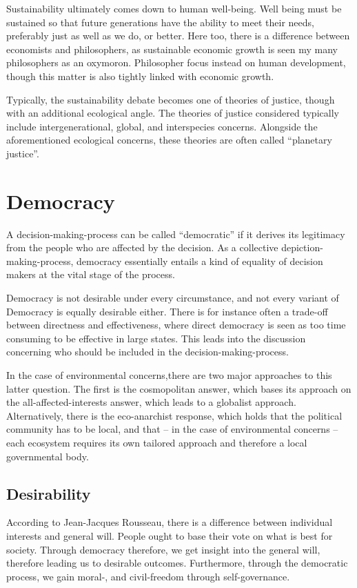 \documentclass[12pt]{report}
\begin{document}
Sustainability ultimately comes down to human well-being. Well being must be
sustained so that future generations have the ability to meet their needs,
preferably just as well as we do, or better. Here too, there is a difference
between economists and philosophers, as sustainable economic growth is seen my
many philosophers as an oxymoron. Philosopher focus instead on human
development, though this matter is also tightly linked with economic growth.

Typically, the sustainability debate becomes one of theories of justice, though
with an additional ecological angle. The theories of justice considered
typically include intergenerational, global, and interspecies concerns.
Alongside the aforementioned ecological concerns, these theories are often
called ``planetary justice''.

\chapter{Democracy}

A decision-making-process can be called ``democratic'' if it derives its
legitimacy from the people who are affected by the decision. As a collective
depiction-making-process, democracy essentially entails a kind of equality of
decision makers at the vital stage of the process.

Democracy is not desirable under every circumstance, and not every variant of
Democracy is equally desirable either. There is for instance often a trade-off
between directness and effectiveness, where direct democracy is seen as too time
consuming to be effective in large states. This leads into the discussion
concerning who should be included in the decision-making-process.

In the case of environmental concerns,there are two major approaches to this
latter question. The first is the cosmopolitan answer, which bases its approach
on the all-affected-interests answer, which leads to a globalist approach.
Alternatively, there is the eco-anarchist response, which holds that the
political community has to be local, and that -- in the case of environmental
concerns -- each ecosystem requires its own tailored approach and therefore a
local governmental body.

\section{Desirability}

According to Jean-Jacques Rousseau, there is a difference between individual
interests and general will. People ought to base their vote on what is best for
society. Through democracy therefore, we get insight into the general will,
therefore leading us to desirable outcomes. Furthermore, through the democratic
process, we gain moral-, and civil-freedom through self-governance.
\end{document}
